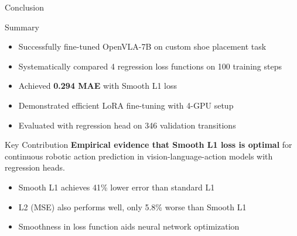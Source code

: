 \documentclass[aspectratio=169]{beamer}
\begin{document}
\begin{frame}{Conclusion}
\begin{block}{Summary}
\begin{itemize}
    \item Successfully fine-tuned OpenVLA-7B on custom shoe placement task
    \item Systematically compared 4 regression loss functions on 100 training steps
    \item Achieved \textbf{0.294 MAE} with Smooth L1 loss
    \item Demonstrated efficient LoRA fine-tuning with 4-GPU setup
    \item Evaluated with regression head on 346 validation transitions
\end{itemize}
\end{block}

\vspace{0.3cm}

\begin{block}{Key Contribution}
\textbf{Empirical evidence that Smooth L1 loss is optimal} for continuous robotic action prediction in vision-language-action models with regression heads.
\begin{itemize}
    \item Smooth L1 achieves 41\% lower error than standard L1
    \item L2 (MSE) also performs well, only 5.8\% worse than Smooth L1
    \item Smoothness in loss function aids neural network optimization
\end{itemize}
\end{block}


\end{frame}

\appendix
\end{document}
